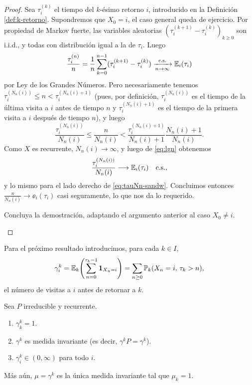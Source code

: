 \begin{proof}
Sea $\tau^{(k)}_i$ el tiempo del $k$-ésimo retorno $i$, introducido en la Definición \ref{def:k-retorno}.
Supondremos que $X_0=i$, el caso general queda de ejercicio.
Por propiedad de Markov fuerte, las variables aleatorias $(\tau^{(k+1)}_i-\tau^{(k)}_i)_{k\geq0}$ son i.i.d., y todas con distribución igual a la de $\tau_i$.
Luego
\begin{equation}
\frac{\tau^{(n)}_i}{n}=\frac1{n}\sum_{k=0}^{n-1}(\tau^{(k+1)}_i-\tau^{(k)}_i)
\xrightarrow[n\to\infty]{\text{\upshape{c.s.}}}\mathbb{E}_i(\tau_i)\label{eq:lgn}
\end{equation}
por Ley de los Grandes Números.
Pero necesariamente tenemos $\tau^{(N_n(i))}_i\leq n<\tau^{(N_n(i)+1)}_i$ (pues, por definición, $\tau^{(N_n(i))}_i$ es el tiempo de la última visita a $i$ antes de tiempo $n$ y $\tau^{(N_n(i)+1)}_i$ es el tiempo de la primera visita a $i$ después de tiempo $n$), y luego
\begin{equation}
\frac{\tau^{(N_n(i))}_i}{N_n(i)}\leq\frac{n}{N_n(i)}<\frac{\tau^{(N_n(i)+1)}_i}{N_n(i)+1}\frac{N_n(i)+1}{N_n(i)}.\label{eq:tauNn-sandw}
\end{equation}
Como $X$ es recurrente, $N_n(i)\to\infty$, y luego de \eqref{eq:lgn} obtenemos 
\[\frac{\tau_i^{(N_n(i))}}{N_n(i)}\longrightarrow\mathbb{E}_i(\tau_i)\quad\text{\upshape{c.s.}},\]
y lo mismo para el lado derecho de \eqref{eq:tauNn-sandw}.
Concluimos entonces $\frac{n}{N_n(i)}\longrightarrow\ee_i(\tau_i)$ casi seguramente, lo que nos da lo requerido.

\begin{exer}
Concluya la demostración, adaptando el argumento anterior al caso $X_0\neq i$.\qedhere
\end{exer}
\end{proof}

Para el próximo resultado introducimos, para cada $k\in I$,
\[\gamma_i^k=\mathbb{E}_k\!\left(\sum_{n=0}^{\tau_k-1}\mathbf{1}_{X_n=i}\right)=\sum_{n\geq0}\mathbb{P}_k(X_n=i,\,\tau_k>n),\]
el número de visitas a $i$ antes de retornar a $k$.

\begin{prop}\label{prop:gammaik}
Sea $P$ irreducible y recurrente.
\begin{enumerate}[label=\uptext{(\alph*)}]
\item $\gamma^k_k=1$.
\item $\gamma^k$ es medida invariante (es decir, $\gamma^kP=\gamma^k$).
\item $\gamma^k_i\in(0,\infty)$ para todo $i$.
\end{enumerate}
Más aún, $\mu=\gamma^k$ es la única medida invariante tal que $\mu_k=1$.
\end{prop}

